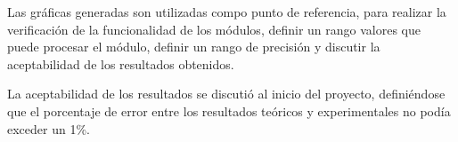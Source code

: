 Las gráficas generadas son utilizadas compo punto de referencia, para realizar la verificación de la funcionalidad de los módulos, definir un rango valores que puede procesar el módulo, definir un rango de precisión y discutir la aceptabilidad de los resultados obtenidos.

La aceptabilidad de los resultados se discutió al inicio del proyecto, definiéndose que el porcentaje de error entre los resultados teóricos y experimentales no podía exceder un 1\%.